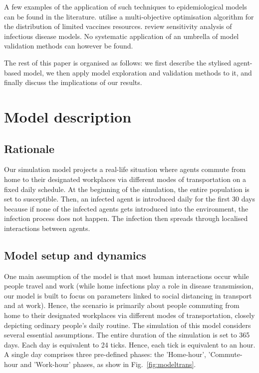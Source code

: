 \documentclass[smallextended]{svjour3}       %
\begin{document}
A few examples of the application of such techniques to epidemiological models can be found in the literature. \cite{baquela2022optimising} utilise a multi-objective optimisation algorithm for the distribution of limited vaccines resources. \cite{wu2013sensitivity} review sensitivity analysis of infectious disease models. No systematic application of an umbrella of model validation methods can however be found.


The rest of this paper is organised as follows: we first describe the stylised agent-based model, we then apply model exploration and validation methods to it, and finally discuss the implications of our results.




\section{Model description}


\subsection{Rationale}

Our simulation model projects a real-life situation where agents commute from home to their designated workplaces via different modes of transportation on a fixed daily schedule. At the beginning of the simulation, the entire population is set to susceptible. Then, an infected agent is introduced daily for the first 30 days because if none of the infected agents gets introduced into the environment, the infection process does not happen. The infection then spreads through localised interactions between agents.


\subsection{Model setup and dynamics}

One main assumption of the model is that most human interactions occur while people travel and work (while home infections play a role in disease transmission, our model is built to focus on parameters linked to social distancing in transport and at work). Hence, the scenario is primarily about people commuting from home to their designated workplaces via different modes of transportation, closely depicting ordinary people's daily routine. The simulation of this model considers several essential assumptions. The entire duration of the simulation is set to 365 days. Each day is equivalent to 24 ticks. Hence, each tick is equivalent to an hour. A single day comprises three pre-defined phases: the 'Home-hour', 'Commute-hour and 'Work-hour' phases, as show in Fig.~\ref{fig:modeltrans}.
\end{document}
